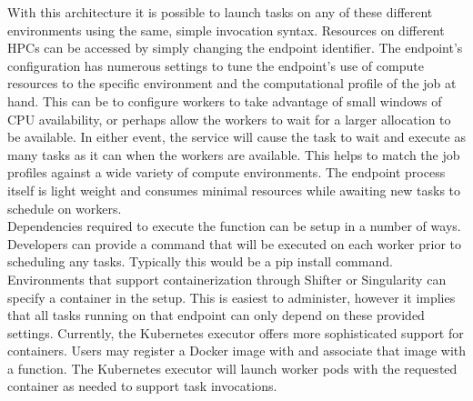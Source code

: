 With this architecture it is possible to launch tasks on any of these different environments using the same, simple invocation syntax. Resources on different HPCs can be accessed by simply changing the endpoint identifier. The endpoint's configuration has numerous settings to tune the endpoint's use of compute resources to the specific environment and the computational profile of the job at hand. This can be to configure workers to take advantage of small windows of CPU availability, or perhaps allow the workers to wait for a larger allocation to be available. In either event, the \funcX{} service will cause the task to wait and execute as many tasks as it can when the workers are available.  This helps to match the job profiles against a wide variety of compute environments. The endpoint process itself is light weight and consumes minimal resources while awaiting new tasks to schedule on workers.\\

Dependencies required to execute the function can be setup in a number of ways. Developers can provide a command that will be executed on each worker prior to scheduling any tasks. Typically this would be a pip install command. Environments that support containerization through Shifter or Singularity can specify a container in the setup. This is easiest to administer, however it implies that all tasks running on that endpoint can only depend on these provided settings. Currently, the Kubernetes executor offers more sophisticated support for containers. Users may register a Docker image with \funcX{} and associate that image with a function. The Kubernetes executor will launch worker pods with the requested container as needed to support task invocations.
